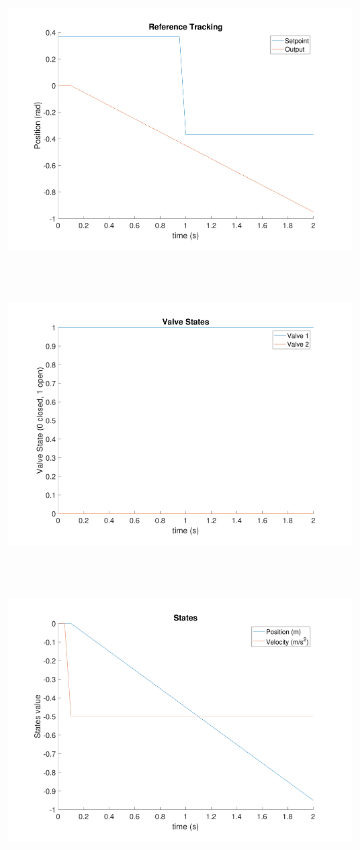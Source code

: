 \documentclass[11pt,a4paper]{article}
\begin{document}
\begin{figure}[!hbt]
    \centering
    \begin{subfigure}[t]{0.45\textwidth}
    \centering
    \includegraphics[width=\textwidth]{figure1.pdf}
    \caption{}
    \end{subfigure}
    ~
    \begin{subfigure}[t]{0.45\textwidth}
    \centering
    \includegraphics[width=\textwidth]{figure2.pdf}
    \caption{}
    \end{subfigure}\\
    \begin{subfigure}[t]{0.45\textwidth}
    \centering
    \includegraphics[width=\textwidth]{figure3.pdf}

\end{subfigure}
\end{figure}
\end{document}
